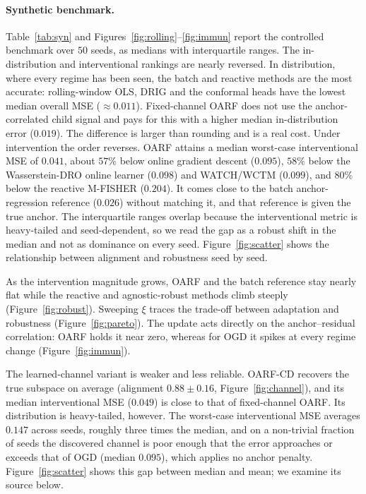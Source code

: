 \documentclass[11pt]{article}
\theoremstyle{plain}
\theoremstyle{remark}
\newcommand{\OARF}{\textsc{OARF}}
\newcommand{\OARFCD}{\textsc{OARF-CD}}
\begin{document}
\paragraph{Synthetic benchmark.}
Table~\ref{tab:syn} and Figures~\ref{fig:rolling}--\ref{fig:immun} report the controlled
benchmark over $50$ seeds, as medians with interquartile ranges. The in-distribution and
interventional rankings are nearly reversed. In distribution, where every regime has been
seen, the batch and reactive methods are the most accurate: rolling-window OLS, DRIG and
the conformal heads have the lowest median overall MSE ($\approx 0.011$). Fixed-channel
\OARF{} does not use the anchor-correlated child signal and pays for this with a higher
median in-distribution error ($0.019$). The difference is larger than rounding and is a
real cost. Under intervention the order reverses. \OARF{} attains a median
worst-case interventional MSE of $0.041$, about $57\%$ below online gradient descent
($0.095$), $58\%$ below the Wasserstein-DRO online learner ($0.098$) and WATCH/WCTM
($0.099$), and $80\%$ below the reactive M-FISHER ($0.204$). It comes close to the batch
anchor-regression reference ($0.026$) without matching it, and that reference is given the
true anchor. The interquartile ranges overlap because the interventional metric is
heavy-tailed and seed-dependent, so we read the gap as a robust shift in the median and not
as dominance on every seed. Figure~\ref{fig:scatter} shows the relationship between
alignment and robustness seed by seed.

As the intervention magnitude grows, \OARF{} and the batch reference stay nearly flat while
the reactive and agnostic-robust methods climb steeply (Figure~\ref{fig:robust}). Sweeping
$\xi$ traces the trade-off between adaptation and robustness (Figure~\ref{fig:pareto}). The
update acts directly on the anchor--residual correlation: \OARF{} holds it near zero,
whereas for OGD it spikes at every regime change (Figure~\ref{fig:immun}).

The learned-channel variant is weaker and less reliable. \OARFCD{} recovers the true
subspace on average (alignment $0.88\pm0.16$, Figure~\ref{fig:channel}), and its median
interventional MSE ($0.049$) is close to that of fixed-channel \OARF{}. Its distribution is
heavy-tailed, however. The worst-case interventional MSE averages $0.147$ across seeds,
roughly three times the median, and on a non-trivial fraction of seeds the discovered
channel is poor enough that the error approaches or exceeds that of OGD (median $0.095$),
which applies no anchor penalty. Figure~\ref{fig:scatter} shows this gap between median and
mean; we examine its source below.
\end{document}
